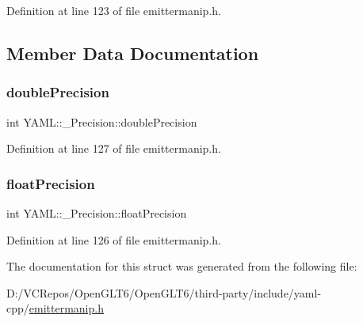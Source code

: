 Definition at line 123 of file emittermanip.\+h.



\subsection{Member Data Documentation}
\mbox{\label{struct_y_a_m_l_1_1___precision_a83839ae6543a9a771b17bca886b97b69}} 
\subsubsection{\texorpdfstring{doublePrecision}{doublePrecision}}
{\footnotesize\ttfamily int Y\+A\+M\+L\+::\+\_\+\+Precision\+::double\+Precision}



Definition at line 127 of file emittermanip.\+h.

\mbox{\label{struct_y_a_m_l_1_1___precision_a0d7c7c0d93e93d16bf0ace70ecc3fa2a}} 
\subsubsection{\texorpdfstring{floatPrecision}{floatPrecision}}
{\footnotesize\ttfamily int Y\+A\+M\+L\+::\+\_\+\+Precision\+::float\+Precision}



Definition at line 126 of file emittermanip.\+h.



The documentation for this struct was generated from the following file\+:\begin{DoxyCompactItemize}
\item 
D\+:/\+V\+C\+Repos/\+Open\+G\+L\+T6/\+Open\+G\+L\+T6/third-\/party/include/yaml-\/cpp/\mbox{\hyperlink{emittermanip_8h}{emittermanip.\+h}}\end{DoxyCompactItemize}
